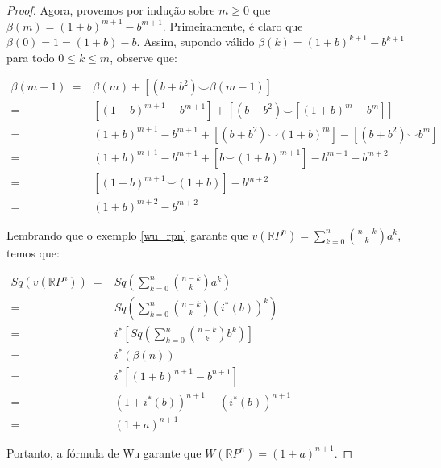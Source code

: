 \documentclass[12pt,oneside]{book} %
\newcommand{\ds}{\displaystyle}
\newcommand{\RP}{\mathbb{R}P}
\newcommand{\ccup}{\smile}
\begin{document}
\begin{proof}
	\par Agora, provemos por indução sobre $m\geq 0$ que $\beta(m)=(1+b)^{m+1}-b^{m+1}$. Primeiramente, é claro que $\beta(0)=1=(1+b)-b$. Assim, supondo válido $\beta(k)=(1+b)^{k+1}-b^{k+1}$ para todo $0\leq k\leq m$, observe que: \newline
	
	$ \begin{array}{rl}
		\beta(m+1) \ = & \beta(m)+\left[ (b+b^{2})\ccup\beta(m-1) \right] \\
		= & \left[ (1+b)^{m+1}-b^{m+1} \right]+\left[ (b+b^{2})\ccup \left[ (1+b)^{m}-b^{m} \right] \right] \\
		= & (1+b)^{m+1}-b^{m+1}+\left[ (b+b^{2})\ccup (1+b)^{m} \right]-\left[ (b+b^{2})\ccup b^{m} \right] \\
		= & (1+b)^{m+1}-b^{m+1}+\left[ b\ccup (1+b)^{m+1} \right]-b^{m+1}-b^{m+2} \\
		= & \left[ (1+b)^{m+1}\ccup (1+b) \right]-b^{m+2} \\
		= & (1+b)^{m+2}-b^{m+2}
	\end{array} $ \newline
	
	\par Lembrando que o exemplo \ref{wu_rpn} garante que $v(\RP^{n})=\ds\sum_{k=0}^{n}\binom{n-k}{k}a^{k}$, temos que: \newline
	
	$ \begin{array}{rl}
		Sq(v(\RP^{n})) \ = & Sq\left( \ds\sum_{k=0}^{n}\binom{n-k}{k}a^{k} \right) \\
		= & Sq\left( \ds\sum_{k=0}^{n}\binom{n-k}{k}(i^{*}(b))^{k} \right) \\
		= & i^{*}\left[ Sq \left( \ds\sum_{k=0}^{n}\binom{n-k}{k}b^{k} \right) \right] \\
		= & i^{*}(\beta(n)) \\
		= & i^{*}\left[ (1+b)^{n+1}-b^{n+1} \right] \\
		= & (1+i^{*}(b))^{n+1}-(i^{*}(b))^{n+1} \\
		= & (1+a)^{n+1}
	\end{array} $
	
	\par Portanto, a fórmula de Wu garante que $W(\RP^{n})=(1+a)^{n+1}$.
	
\end{proof}



\end{document}
